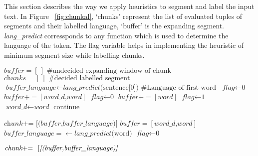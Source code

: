 \documentclass[11pt]{article}
\begin{document}
This section describes the way we apply heuristics to segment and label the input text.
In Figure ~\ref{fig:chunkal}, `chunks' represent the list of evaluated tuples of segments and their labelled language, `buffer' is the expanding segment.
 \textit{lang\_predict} corressponds to any function which is used to determine the language of the token. The flag 
variable helps in implementing the heuristic of minimum segment size while labelling chunks.
\begin{algorithm}
\caption*{\textsc{}}
{\fontsize{9}{9}\selectfont
\begin{algorithmic}[1]
\State $\textit{buffer} = [\ ] \text{\ \ \  \#undecided expanding window of chunk}$
\State $\textit{chunks} = [\ ] \text{\ \ \  \#decided labelled segment}$
\State $\textit{buffer\_language} \gets \textit{lang\_predict}\text{(sentence[0])} \text{\ \ \ \#Language of first word}$
\State $\textit{flag} \gets \text{0}$
        \State $\textit{buffer} += [\textit{word\_d,word}] $
        \State $\textit{flag} \gets \text{0}$
        \Else
        \State $\textit{buffer} += [\textit{word}] $
        \EndIf
        \EndIf
{}
        \State $\textit{flag} \gets \text{1}$
        \State $\textit{word\_d} \gets \textit{word} $
        \State $\text{continue}$

        \Else
        \State $\textit{chunk} \text{+= \ }  \textit{[(buffer,buffer\_language)]} $
        \State $\textit{buffer} = [\textit{word\_d,word}] $
        \State $\textit{buffer\_language} = \gets \textit{lang\_predict}\text{(word)}$%
        \State $\textit{flag} \gets \text{0}$
        \EndIf

\EndIf
\EndFor
{}
        \State $\textit{chunk} \text{+= \ }  \text{[\textit{[(buffer,buffer\_language)]}} $

\EndIf
\end{algorithmic}}
\end{algorithm}
\end{document}
